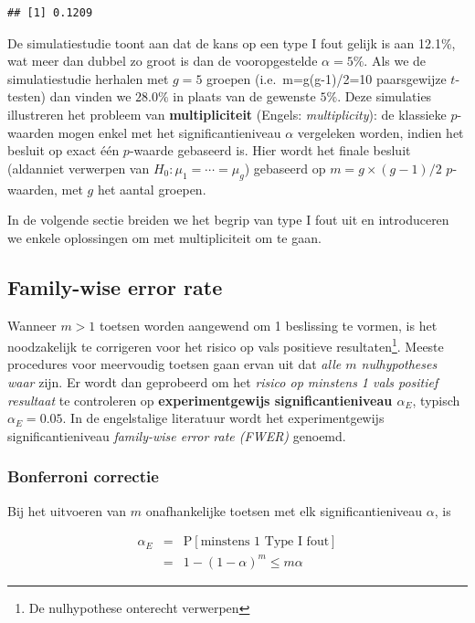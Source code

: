 \documentclass[
  12pt,dutch]{book}
\theoremstyle{definition}
\theoremstyle{definition}
\theoremstyle{definition}
\theoremstyle{definition}
\theoremstyle{remark}
\begin{document}
\begin{verbatim}
## [1] 0.1209
\end{verbatim}

De simulatiestudie toont aan dat de kans op een type I fout gelijk is aan 12.1\%, wat meer dan dubbel zo groot is dan de vooropgestelde \(\alpha=5\%\).
Als we de simulatiestudie herhalen met \(g=5\) groepen (i.e.~m=g(g-1)/2=10 paarsgewijze \(t\)-testen) dan vinden we \(28.0\%\) in plaats van de gewenste \(5\%\).
Deze simulaties illustreren het probleem van \textbf{multipliciteit} (Engels: \emph{multiplicity}): de klassieke \(p\)-waarden mogen enkel met het significantieniveau \(\alpha\) vergeleken worden, indien het besluit op exact één \(p\)-waarde gebaseerd is. Hier wordt het finale besluit (aldanniet verwerpen van \(H_0: \mu_1=\cdots =\mu_g\)) gebaseerd op \(m=g\times(g-1)/2\) \(p\)-waarden, met \(g\) het aantal groepen.

In de volgende sectie breiden we het begrip van type I fout uit en introduceren we enkele oplossingen om met multipliciteit om te gaan.

\subsection{Family-wise error rate}\label{family-wise-error-rate}

Wanneer \(m>1\) toetsen worden aangewend om 1 beslissing te vormen, is het noodzakelijk te corrigeren voor het risico op vals positieve resultaten\footnote{De nulhypothese onterecht verwerpen}.
Meeste procedures voor meervoudig toetsen gaan ervan uit dat \emph{alle \(m\) nulhypotheses waar} zijn.
Er wordt dan geprobeerd om het \emph{risico op minstens 1 vals positief resultaat} te controleren op \textbf{experimentgewijs significantieniveau \(\alpha_E\)}, typisch \(\alpha_E=0.05\). In de engelstalige literatuur wordt het experimentgewijs significantieniveau \emph{family-wise error rate (FWER)} genoemd.

\subsubsection{Bonferroni correctie}\label{bonferroni-correctie}

Bij het uitvoeren van \(m\) onafhankelijke toetsen met elk significantieniveau \(\alpha\), is

\begin{eqnarray*}
\alpha_E&=&\text{P}[\text{minstens 1 Type I fout}]\\
&=&1-(1-\alpha)^m \leq m\alpha
\end{eqnarray*}
\end{document}
